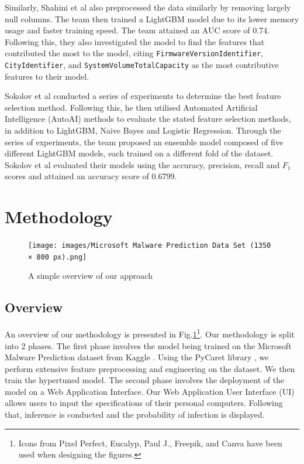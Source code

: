 \documentclass[pdflatex,sn-basic,Numbered]{sn-jnl}%
\theoremstyle{thmstyleone}%
\theoremstyle{thmstyletwo}%
\theoremstyle{thmstylethree}%
\begin{document}
Similarly, Shahini et al \cite{shahini2019} also preprocessed the data similarly by removing largely null columns. The team then trained a LightGBM model due to its lower memory usage and faster training speed. The team attained an AUC score of 0.74. Following this, they also investigated the model to find the features that contributed the most to the model, citing \texttt{FirmwareVersionIdentifier}, \texttt{CityIdentifier},  and \texttt{SystemVolumeTotalCapacity} as the most contributive features to their model.

Sokolov et al \cite{sokolov2021} conducted a series of experiments to determine the best feature selection method. Following this, he then utilised Automated Artificial Intelligence (AutoAI) methods to evaluate the stated feature selection methods, in addition to LightGBM, Naive Bayes and Logistic Regression. Through the series of experiments, the team proposed an ensemble model composed of five different LightGBM models, each trained on a different fold of the dataset. Sokolov et al evaluated their models using the accuracy, precision, recall and $F_1$ scores and attained an accuracy score of 0.6799.

\section{Methodology}

\begin{figure}[h]
\texttt{[image: images/Microsoft Malware Prediction Data Set (1350 × 800 px).png]}
\centering
\caption{A simple overview of our approach}
\label{Fig 1}
\end{figure}
\subsection{Overview}
An overview of our methodology is presented in Fig.\ref{Fig 1}\footnote[1]{Icons from Pixel Perfect, Eucalyp, Paul J., Freepik, and Canva have been used when designing the figures.}. Our methodology is split into 2 phases. The first phase involves the model being trained on the Microsoft Malware Prediction dataset from Kaggle \cite{microsoft-malware-prediction}. Using the PyCaret library \cite{pycaret}, we perform extensive feature preprocessing and engineering on the dataset. We then train the hypertuned model. The second phase involves the deployment of the model on a Web Application Interface. Our Web Application User Interface (UI) allows users to input the specifications of their personal computers. Following that, inference is conducted and the probability of infection is displayed.
\end{document}

